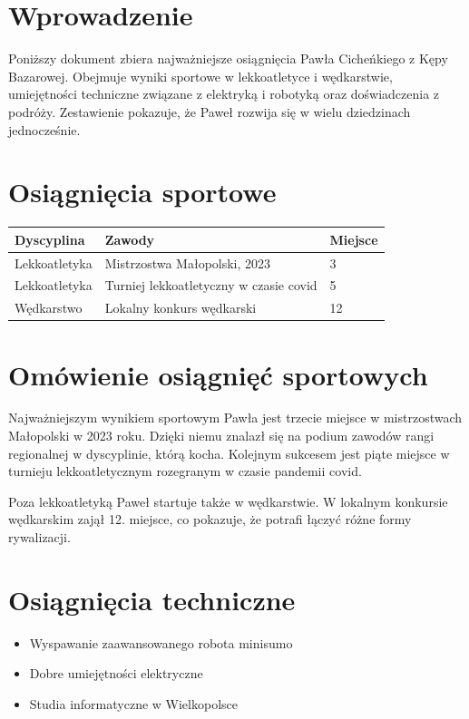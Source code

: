 \section*{Wprowadzenie}
Poniższy dokument zbiera najważniejsze osiągnięcia Pawła Cicheńkiego z Kępy Bazarowej. Obejmuje wyniki sportowe w lekkoatletyce i wędkarstwie, umiejętności techniczne związane z elektryką i robotyką oraz doświadczenia z podróży. Zestawienie pokazuje, że Paweł rozwija się w wielu dziedzinach jednocześnie.

\section*{Osiągnięcia sportowe}
\begin{tabularx}{\textwidth}{@{}lXl@{}}
\toprule
\textbf{Dyscyplina} & \textbf{Zawody} & \textbf{Miejsce} \\
\midrule
Lekkoatletyka & Mistrzostwa Małopolski, 2023 & 3 \\
Lekkoatletyka & Turniej lekkoatletyczny w czasie covid & 5 \\
Wędkarstwo & Lokalny konkurs wędkarski & 12 \\
\bottomrule
\end{tabularx}

\vspace{0.4cm}

\section*{Omówienie osiągnięć sportowych}
Najważniejszym wynikiem sportowym Pawła jest trzecie miejsce w mistrzostwach Małopolski w 2023 roku. Dzięki niemu znalazł się na podium zawodów rangi regionalnej w dyscyplinie, którą kocha. Kolejnym sukcesem jest piąte miejsce w turnieju lekkoatletycznym rozegranym w czasie pandemii covid.

Poza lekkoatletyką Paweł startuje także w wędkarstwie. W lokalnym konkursie wędkarskim zajął 12. miejsce, co pokazuje, że potrafi łączyć różne formy rywalizacji.

\section*{Osiągnięcia techniczne}
\begin{itemize}
\item Wyspawanie zaawansowanego robota minisumo
\item Dobre umiejętności elektryczne
\item Studia informatyczne w Wielkopolsce
\end{itemize}

